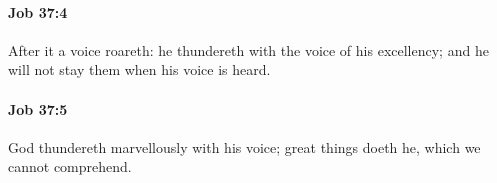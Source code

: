 		\paragraph{Job 37:4} %
			\label{JOB-37-4}

			After it a voice roareth: he thundereth with the voice of his excellency; and he will not stay them when his voice is heard.


		\paragraph{Job 37:5} %
			\label{JOB-37-5}

			God thundereth marvellously with his voice; great things doeth he, which we cannot comprehend.


